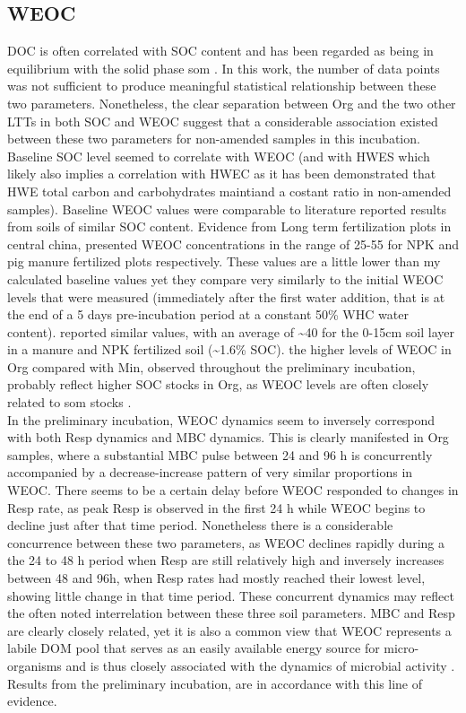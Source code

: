 \documentclass[12pt]{report}
\begin{document}
		\subsection{WEOC}
		DOC is often correlated with SOC content and has been regarded as being in equilibrium with the solid phase \gls{som} \citep{malik2013}. In this work, the number of data points was not sufficient to produce meaningful statistical relationship between these two parameters. Nonetheless, the clear separation between Org and the two other LTTs in both SOC and WEOC suggest that a considerable association existed between these two parameters for non-amended samples in this incubation. Baseline SOC level seemed to correlate with WEOC (and with HWES which likely also implies a correlation with HWEC as it has been demonstrated that HWE total carbon and carbohydrates maintiand a costant ratio in non-amended samples).
		Baseline WEOC values were comparable to literature reported results from soils of similar SOC content. Evidence from Long term fertilization plots in central china, presented WEOC concentrations in the range of 25-55 \genericunit for NPK and pig manure fertilized plots respectively\citep{xu2018}. These values are a little lower than my calculated baseline values yet they compare very similarly to the initial WEOC levels that were measured (immediately after the first water addition, that is  at the end of a 5 days pre-incubation period at a constant 50\% WHC water content). \citet{hamkalo2014} reported similar values, with an average of \~{}40 \genericunit for the 0-15cm  soil layer in a manure and NPK fertilized soil (\~{}1.6\% SOC).
		the higher levels of WEOC in Org compared with Min, observed throughout the preliminary incubation, probably reflect higher SOC stocks in Org, as WEOC levels are often closely related to \gls{som} stocks\citep{malik2013} .\\
		In the preliminary incubation, WEOC dynamics seem to inversely correspond with both Resp dynamics and MBC dynamics. This is clearly manifested in Org samples, where a substantial MBC pulse between 24 and 96 h is concurrently accompanied by a decrease-increase pattern of very similar proportions in WEOC. There seems to be a certain delay before WEOC responded to changes in Resp rate, as peak Resp is observed in the first 24 h while WEOC begins to decline just after that time period. Nonetheless there is a considerable concurrence between these two parameters, as WEOC declines rapidly during a the 24 to 48 h period when Resp are still relatively high and inversely increases between 48 and 96h, when Resp rates had mostly reached their lowest level, showing little change in that time period. These concurrent dynamics may reflect the often noted interrelation between these three soil parameters. MBC and Resp are clearly closely related, yet it is also a common view that WEOC represents a labile DOM pool that serves as an easily available energy source for micro-organisms and is thus closely associated with the dynamics of microbial activity \citep{kemmitt2008, kaiser2012, guggenberger1998}. Results from the preliminary incubation, are in accordance with this line of evidence.\\
		
\end{document}
